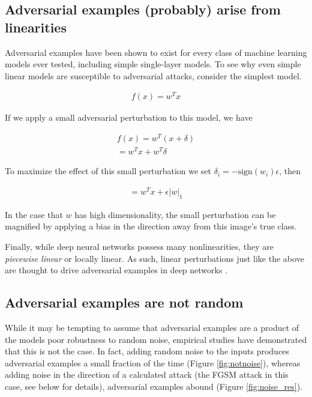 \documentclass[10pt]{article}
\begin{document}
\subsection{Adversarial examples (probably) arise from linearities}

Adversarial examples have been shown to exist for every class of machine learning models ever tested, including simple single-layer models. To see why even simple linear models are susceptible to adversarial attacks, consider the simplest model.

\begin{align*}
f(x) = w^Tx
\end{align*}

If we apply a small adversarial perturbation to this model, we have

\begin{align*}
f(x) = w^T(x + \delta) \\
= w^Tx + w^T\delta
\end{align*}

To maximize the effect of this small perturbation we set $\delta_i = -\text{sign}(w_i)\epsilon$, then

\begin{align*}
= w^Tx + \epsilon|w|_1
\end{align*}

In the case that $w$ has high dimensionality, the small perturbation can be magnified by applying a bias in the direction away from this image's true class.

Finally, while deep neural networks possess many nonlinearities, they are \textit{piecewise linear} or locally linear.  As such, linear perturbations just like the above are thought to drive adversarial examples in deep networks \cite{goodfellow2014}.

\subsection{Adversarial examples are not random}

While it may be tempting to assume that adversarial examples are a product of the models poor robustness to random noise, empirical studies have demonstrated that this is not the case.  In fact, 
adding random noise to the inputs produces adversarial examples a small fraction of the time (Figure \ref{fig:notnoise}), whereas adding noise in the direction of a calculated attack (the FGSM attack in this case, see below for details), adversarial examples abound (Figure \ref{fig:noise_res}).
\end{document}
